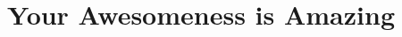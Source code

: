 \documentclass[10pt,twocolumn,letterpaper]{article}
\title{Your Awesomeness is Amazing}
\begin{document}
\maketitle

\begin{abstract}

\end{abstract}






\end{document}
